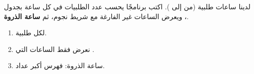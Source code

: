 \begin{statement}
لدينا ساعات  طلبية (من  إلى ). اكتب برنامجًا يحسب عدد الطلبيات في كل ساعة بجدول ، ويعرض الساعات غير الفارغة مع شريط نجوم، ثم \textbf{ساعة الذروة}.
\end{statement}
\begin{stepsbox}\begin{enumerate}
\item {} لكل طلبية.
\item نعرض فقط الساعات التي .
\item ساعة الذروة: فهرس أكبر عداد.
\end{enumerate}\end{stepsbox}

